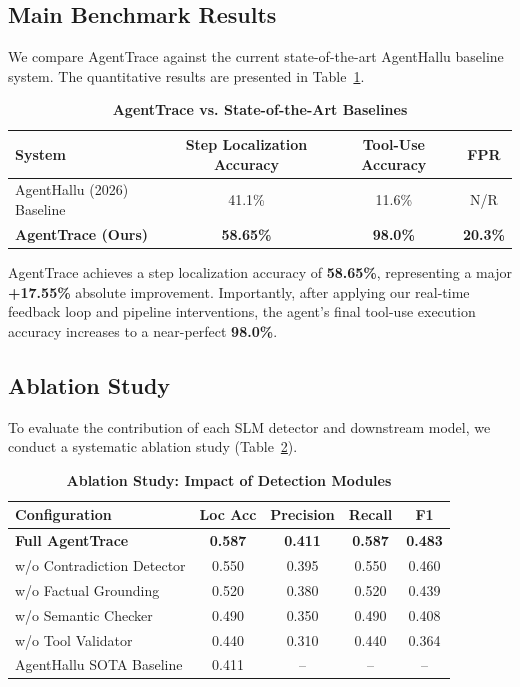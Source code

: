\documentclass[11pt,a4paper]{article}
\begin{document}
\subsection{Main Benchmark Results}
We compare AgentTrace against the current state-of-the-art AgentHallu baseline system. The quantitative results are presented in Table~\ref{tab:main_results}.

\begin{table}[ht]
\centering
\caption{\textbf{AgentTrace vs. State-of-the-Art Baselines}}
\label{tab:main_results}
\begin{tabular}{lccc}
\toprule
\textbf{System} & \textbf{Step Localization Accuracy} & \textbf{Tool-Use Accuracy} & \textbf{FPR} \\
\midrule
AgentHallu (2026) Baseline & 41.1\% & 11.6\% & N/R \\
\textbf{AgentTrace (Ours)} & \textbf{58.65\%} & \textbf{98.0\%} & \textbf{20.3\%} \\
\bottomrule
\end{tabular}
\end{table}

AgentTrace achieves a step localization accuracy of \textbf{58.65\%}, representing a major \textbf{+17.55\%} absolute improvement. Importantly, after applying our real-time feedback loop and pipeline interventions, the agent's final tool-use execution accuracy increases to a near-perfect \textbf{98.0\%}.

\subsection{Ablation Study}
To evaluate the contribution of each SLM detector and downstream model, we conduct a systematic ablation study (Table~\ref{tab:ablation}).

\begin{table}[ht]
\centering
\caption{\textbf{Ablation Study: Impact of Detection Modules}}
\label{tab:ablation}
\begin{tabular}{lcccc}
\toprule
\textbf{Configuration} & \textbf{Loc Acc} & \textbf{Precision} & \textbf{Recall} & \textbf{F1} \\
\midrule
\textbf{Full AgentTrace} & \textbf{0.587} & \textbf{0.411} & \textbf{0.587} & \textbf{0.483} \\
w/o Contradiction Detector & 0.550 & 0.395 & 0.550 & 0.460 \\
w/o Factual Grounding & 0.520 & 0.380 & 0.520 & 0.439 \\
w/o Semantic Checker & 0.490 & 0.350 & 0.490 & 0.408 \\
w/o Tool Validator & 0.440 & 0.310 & 0.440 & 0.364 \\
\midrule
AgentHallu SOTA Baseline & 0.411 & -- & -- & -- \\
\bottomrule
\end{tabular}
\end{table}
\end{document}
